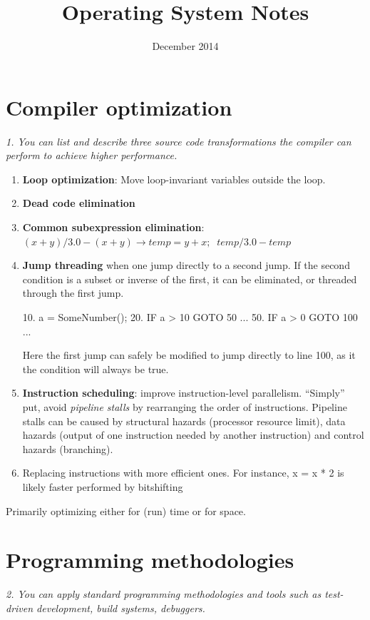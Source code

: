 \documentclass{article}
\title{Operating System Notes}
\author{December 2014}
\date{}
\begin{document}
\maketitle
\tableofcontents
\pagebreak

\setcounter{page}{1}

\section{Compiler optimization}
\emph{1. You can list and describe three source code transformations the compiler can perform to achieve higher performance.}

\begin{enumerate}
  \item \textbf{Loop optimization}: Move loop-invariant variables outside the loop.
  \item \textbf{Dead code elimination}
  \item \textbf{Common subexpression elimination}: $(x + y) / 3.0 - (x + y)\rightarrow temp = y+x;\;\; temp/3.0-temp$
  \item \textbf{Jump threading} when one jump directly to a second jump. If the second condition is a subset or inverse of the first, it can be eliminated, or threaded through the first jump.
  \begin{assembly}
10. a = SomeNumber();
20. IF a > 10 GOTO 50
...
50. IF a > 0 GOTO 100
...
  \end{assembly}
  Here the first jump can safely be modified to jump directly to line 100, as it the condition will always be true.
  \item \textbf{Instruction scheduling}: improve instruction-level parallelism. ``Simply'' put, avoid \emph{pipeline stalls} by rearranging the order of instructions. Pipeline stalls can be caused by structural hazards (processor resource limit), data hazards (output of one instruction needed by another instruction) and control hazards (branching).
  \item Replacing instructions with more efficient ones. For instance, x = x * 2 is likely faster performed by bitshifting
\end{enumerate}

Primarily optimizing either for (run) time or for space.


\section{Programming methodologies}
\emph{2. You can apply standard programming methodologies and tools such as test-driven development, build systems, debuggers.}
\end{document}

